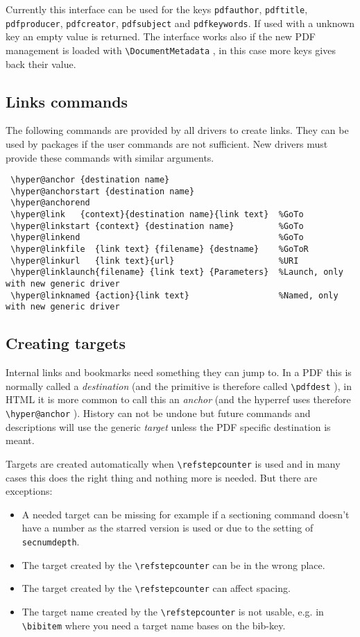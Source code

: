 \documentclass{article}
\newcommand*{\cs}[1]{%
  \texttt{\textbackslash #1}%
}
\newcommand*{\xpackage}[1]{\textsf{#1}}
\begin{document}
Currently this interface can be used for the keys \texttt{pdfauthor}, \texttt{pdftitle},
\texttt{pdfproducer},
\texttt{pdfcreator}, \texttt{pdfsubject} and \texttt{pdfkeywords}.
If used with a unknown key an empty value is returned.
The interface works also if the new PDF management is loaded with \cs{DocumentMetadata}, in this
case more keys gives back their value.


\subsection{Links commands}
The following commands are provided by all drivers to create links.
They can be used by packages if the user commands are not sufficient.
New drivers must provide these commands with similar arguments.

\begin{verbatim}
 \hyper@anchor {destination name}
 \hyper@anchorstart {destination name}
 \hyper@anchorend
 \hyper@link   {context}{destination name}{link text}  %GoTo
 \hyper@linkstart {context} {destination name}         %GoTo
 \hyper@linkend                                        %GoTo
 \hyper@linkfile  {link text} {filename} {destname}    %GoToR
 \hyper@linkurl   {link text}{url}                     %URI
 \hyper@linklaunch{filename} {link text} {Parameters}  %Launch, only with new generic driver
 \hyper@linknamed {action}{link text}                  %Named, only with new generic driver
\end{verbatim}

\subsection{Creating targets}

Internal links and bookmarks need something they can jump to. In a PDF this is normally called
a \emph{destination} (and the primitive is therefore called \cs{pdfdest}), in HTML it is more
common to call this an \emph{anchor} (and the \xpackage{hyperref} uses therefore \cs{hyper@anchor}).
History can not be undone but future commands and descriptions will use the generic
\emph{target} unless the PDF specific destination is meant.

Targets are created automatically when \cs{refstepcounter} is used and in many cases this
does the right thing and nothing more is needed.
But there are exceptions:
\begin{itemize}
\item A needed target can be missing for example
if a sectioning command doesn't have a number as the starred version is used or due to the
setting of \texttt{secnumdepth}.
\item The target created by the \cs{refstepcounter} can be in the wrong place.
\item The target created by the \cs{refstepcounter} can affect spacing.
\item The target name created by the \cs{refstepcounter} is not usable, e.g. in
\cs{bibitem} where you need a target name bases on the bib-key.
\end{itemize}
\end{document}
